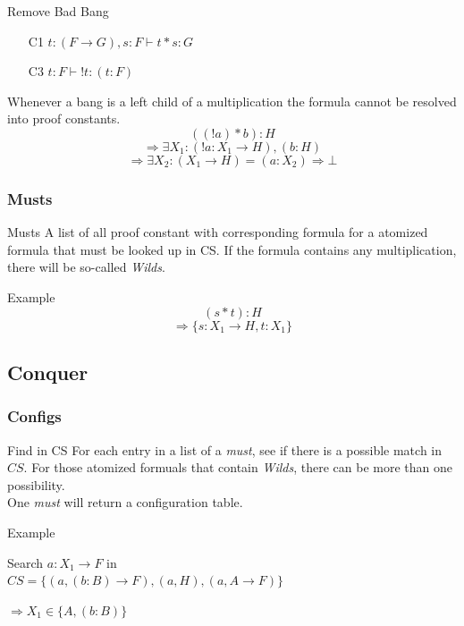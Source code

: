 \documentclass{beamer}
\begin{document}
\begin{frame}{Remove Bad Bang}
	\begin{block}{}
	\begin{itemize}
		\item[C1]$t:(F \to G), s:F \vdash t*s:G$
		\item[C3]$t:F \vdash !t:(t:F)$
	\end{itemize}
	Whenever a bang is a left child of a multiplication the formula cannot be resolved into proof constants.
	\[((!a)*b):H\]
	\[\Rightarrow \exists X_1: (!a: X_1 \rightarrow H), (b:H)\]
	\[\Rightarrow \exists X_2: (X_1 \rightarrow H) = (a: X_2) \Rightarrow \bot\]	
	\end{block}
\end{frame}

\subsubsection{Musts}
\begin{frame}{Musts}
	A list of all proof constant with corresponding formula for a atomized formula that must be looked up in CS.
	If the formula contains any multiplication, there will be so-called \emph{Wilds}.
	
	\begin{block}{Example}
	\[(s*t):H\]
	\[\Rightarrow \{s: X_1 \rightarrow H, t: X_1\}\]
	\end{block}
\end{frame}

\subsection{Conquer}
\subsubsection{Configs}
\begin{frame}{Find in CS}
	For each entry in a list of a \emph{must}, see if there is a possible match in $CS$. For those atomized formuals that contain \emph{Wilds}, there can be more than one possibility. \\
	One \emph{must} will return a configuration table.
	\begin{block}{Example}
		
	Search $a: X_1 \rightarrow F$ in\\
	$CS= \{(a,(b:B) \rightarrow F), (a, H), (a, A \rightarrow F)\}$\\
	\vspace{0.5cm}
	
	$\Rightarrow X_1 \in \{A, (b:B)\}$
	\end{block}
\end{frame}
\end{document}
